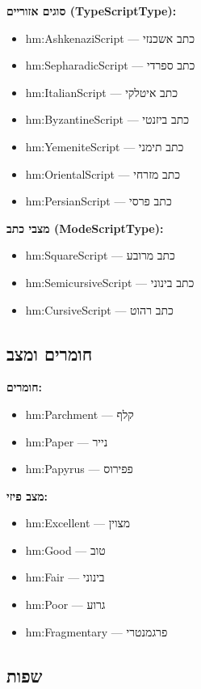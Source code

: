 \textbf{סוגים אזוריים (TypeScriptType):}
\begin{itemize}
\item hm:AshkenaziScript — כתב אשכנזי
\item hm:SepharadicScript — כתב ספרדי
\item hm:ItalianScript — כתב איטלקי
\item hm:ByzantineScript — כתב ביזנטי
\item hm:YemeniteScript — כתב תימני
\item hm:OrientalScript — כתב מזרחי
\item hm:PersianScript — כתב פרסי
\end{itemize}

\textbf{מצבי כתב (ModeScriptType):}
\begin{itemize}
\item hm:SquareScript — כתב מרובע
\item hm:SemicursiveScript — כתב בינוני
\item hm:CursiveScript — כתב רהוט
\end{itemize}

\subsection{חומרים ומצב}

\textbf{חומרים:}
\begin{itemize}
\item hm:Parchment — קלף
\item hm:Paper — נייר
\item hm:Papyrus — פפירוס
\end{itemize}

\textbf{מצב פיזי:}
\begin{itemize}
\item hm:Excellent — מצוין
\item hm:Good — טוב
\item hm:Fair — בינוני
\item hm:Poor — גרוע
\item hm:Fragmentary — פרגמנטרי
\end{itemize}

\subsection{שפות}

